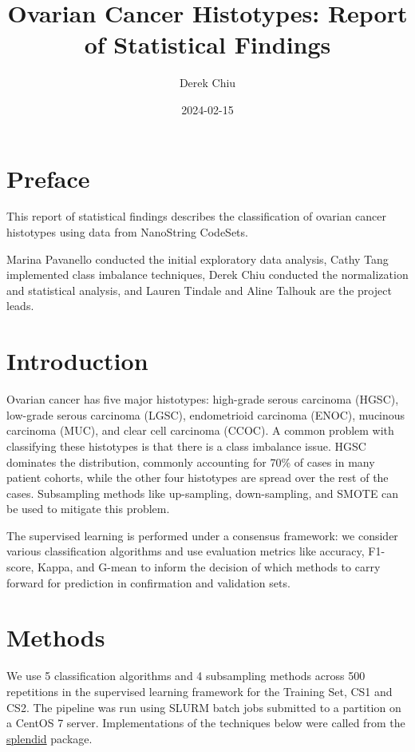 \documentclass[
]{report}
\title{Ovarian Cancer Histotypes: Report of Statistical Findings}
\author{Derek Chiu}
\date{2024-02-15}
\begin{document}
\maketitle

{
\hypersetup{linkcolor=}
\setcounter{tocdepth}{1}
\tableofcontents
}
\listoffigures
\listoftables
\hypertarget{preface}{%
\chapter*{Preface}\label{preface}}

This report of statistical findings describes the classification of ovarian cancer histotypes using data from NanoString CodeSets.

Marina Pavanello conducted the initial exploratory data analysis, Cathy Tang implemented class imbalance techniques, Derek Chiu conducted the normalization and statistical analysis, and Lauren Tindale and Aline Talhouk are the project leads.

\hypertarget{introduction}{%
\chapter{Introduction}\label{introduction}}

Ovarian cancer has five major histotypes: high-grade serous carcinoma (HGSC), low-grade serous carcinoma (LGSC), endometrioid carcinoma (ENOC), mucinous carcinoma (MUC), and clear cell carcinoma (CCOC). A common problem with classifying these histotypes is that there is a class imbalance issue. HGSC dominates the distribution, commonly accounting for 70\% of cases in many patient cohorts, while the other four histotypes are spread over the rest of the cases. Subsampling methods like up-sampling, down-sampling, and SMOTE can be used to mitigate this problem.

The supervised learning is performed under a consensus framework: we consider various classification algorithms and use evaluation metrics like accuracy, F1-score, Kappa, and G-mean to inform the decision of which methods to carry forward for prediction in confirmation and validation sets.

\hypertarget{methods}{%
\chapter{Methods}\label{methods}}

We use 5 classification algorithms and 4 subsampling methods across 500 repetitions in the supervised learning framework for the Training Set, CS1 and CS2. The pipeline was run using SLURM batch jobs submitted to a partition on a CentOS 7 server. Implementations of the techniques below were called from the \href{https://alinetalhouk.github.io/splendid/}{splendid} package.
\end{document}
